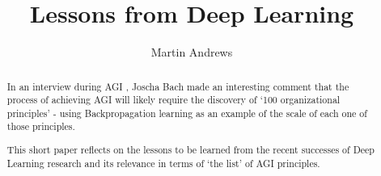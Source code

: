 \documentclass[citeauthoryear]{llncs}
\begin{document}
%
\frontmatter          %
%
\pagestyle{headings}  %
%
\mainmatter              %
%
\title{Lessons from Deep Learning}
%
%
\author{Martin Andrews}
%
%
%

\maketitle              %

\begin{abstract}



In an interview during AGI \cite{Joscha-Bach-2012-interview}, Joscha Bach
made an interesting comment that the process of achieving 
AGI will likely require the discovery of `100 organizational principles' - 
using Backpropagation learning as an example of the scale of each one of those principles.  

This short paper reflects on the lessons to be learned from 
the recent successes of Deep Learning research and its relevance in terms 
of `the list' of AGI principles.

\end{abstract}
%
\end{document}
